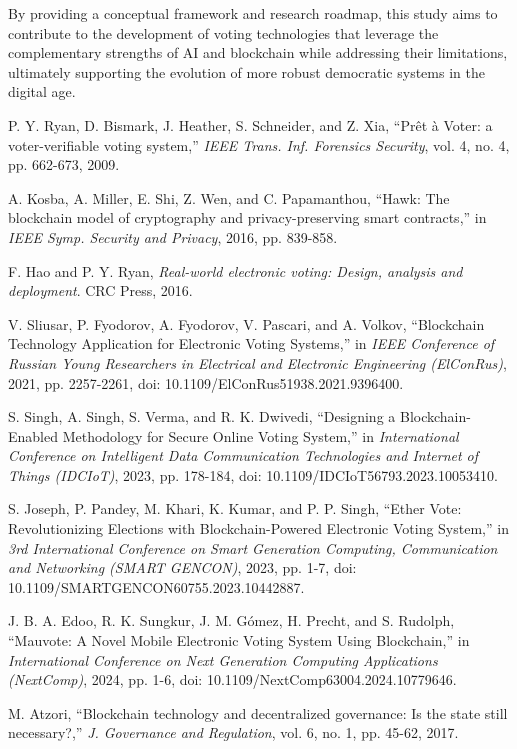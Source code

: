 \documentclass[conference]{IEEEtran}
\begin{document}
By providing a conceptual framework and research roadmap, this study aims to contribute to the development of voting technologies that leverage the complementary strengths of AI and blockchain while addressing their limitations, ultimately supporting the evolution of more robust democratic systems in the digital age.

\begin{thebibliography}{8}
P. Y. Ryan, D. Bismark, J. Heather, S. Schneider, and Z. Xia, ``Prêt à Voter: a voter-verifiable voting system,'' {\it IEEE Trans. Inf. Forensics Security}, vol. 4, no. 4, pp. 662-673, 2009.

A. Kosba, A. Miller, E. Shi, Z. Wen, and C. Papamanthou, ``Hawk: The blockchain model of cryptography and privacy-preserving smart contracts,'' in {\it IEEE Symp. Security and Privacy}, 2016, pp. 839-858.

F. Hao and P. Y. Ryan, {\it Real-world electronic voting: Design, analysis and deployment}. CRC Press, 2016.

V. Sliusar, P. Fyodorov, A. Fyodorov, V. Pascari, and A. Volkov, ``Blockchain Technology Application for Electronic Voting Systems,'' in {\it IEEE Conference of Russian Young Researchers in Electrical and Electronic Engineering (ElConRus)}, 2021, pp. 2257-2261, doi: 10.1109/ElConRus51938.2021.9396400.

S. Singh, A. Singh, S. Verma, and R. K. Dwivedi, ``Designing a Blockchain-Enabled Methodology for Secure Online Voting System,'' in {\it International Conference on Intelligent Data Communication Technologies and Internet of Things (IDCIoT)}, 2023, pp. 178-184, doi: 10.1109/IDCIoT56793.2023.10053410.

S. Joseph, P. Pandey, M. Khari, K. Kumar, and P. P. Singh, ``Ether Vote: Revolutionizing Elections with Blockchain-Powered Electronic Voting System,'' in {\it 3rd International Conference on Smart Generation Computing, Communication and Networking (SMART GENCON)}, 2023, pp. 1-7, doi: 10.1109/SMARTGENCON60755.2023.10442887.

J. B. A. Edoo, R. K. Sungkur, J. M. Gómez, H. Precht, and S. Rudolph, ``Mauvote: A Novel Mobile Electronic Voting System Using Blockchain,'' in {\it International Conference on Next Generation Computing Applications (NextComp)}, 2024, pp. 1-6, doi: 10.1109/NextComp63004.2024.10779646.

M. Atzori, ``Blockchain technology and decentralized governance: Is the state still necessary?,'' {\it J. Governance and Regulation}, vol. 6, no. 1, pp. 45-62, 2017.
\end{thebibliography}
\end{document}
